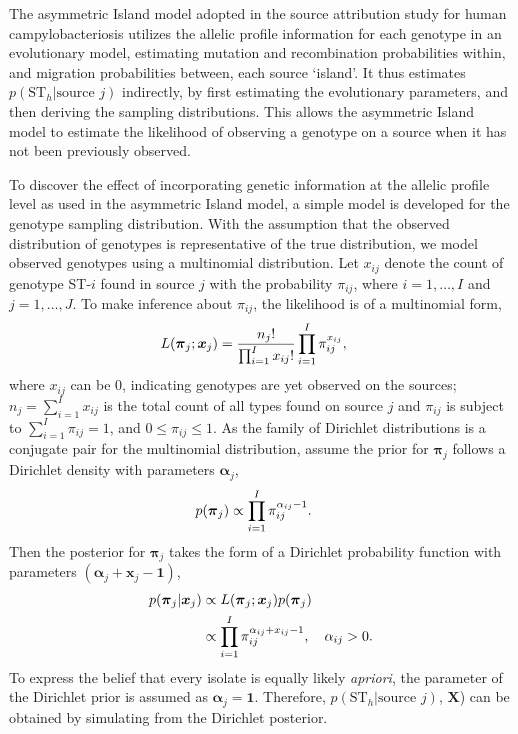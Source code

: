 \documentclass[AMA,STIX1COL]{WileyNJD-v2}
\begin{document}
The asymmetric Island model \cite{Wilso} adopted in the source attribution study for human campylobacteriosis \cite{Marsh} utilizes the allelic profile information for each genotype in an evolutionary model, estimating mutation and recombination probabilities within, and migration probabilities between, each source `island'. It thus estimates $p(\text{ST}_h \vert \text{source }j)$ indirectly, by first estimating the evolutionary parameters, and then deriving the sampling distributions. This allows the asymmetric Island model to estimate the likelihood of observing a genotype on a source when it has not been previously observed.

To discover the effect of incorporating genetic information at the allelic profile level as used in the asymmetric Island model, a simple model is developed for the genotype sampling distribution. With the assumption that the observed distribution of genotypes is representative of the true distribution, we model observed genotypes using a multinomial distribution. Let $x_{ij}$ denote the count of genotype ST-$i$ found in source $j$ with the probability $\pi_{ij}$, where $i=1, \ldots, I$ and $j=1, \ldots, J$. To make inference about $\pi_{ij}$, the likelihood is of a multinomial form,
\begin{align}
        L(\boldsymbol{\pi}_{j} ; \boldsymbol{x}_{j}) & = \frac{n_j!}{\prod_{i=1}^{I} x_{ij}!} \prod_{i=1}^I \pi_{ij}^{x_{ij}}, \notag
\end{align}
where $x_{ij}$ can be $0$, indicating genotypes are yet observed on the sources; $n_j=\sum_{i=1}^I x_{ij}$ is the total count of all types found on source $j$ and $\pi_{ij}$ is subject to $\sum_{i=1}^I \pi_{ij} =1$, and $0 \leq \pi_{ij} \leq 1$. As the family of Dirichlet distributions is a conjugate pair for the multinomial distribution, assume the prior for $\boldsymbol{\pi}_{j}$ follows a Dirichlet density with parameters $\boldsymbol{\alpha}_{j}$,
\begin{align}
  p(\boldsymbol{\pi}_{j}) & \propto \prod_{i=1}^{I}\pi_{ij}^{\alpha_{ij}-1}. \notag
\end{align}
Then the posterior for $\boldsymbol{\pi}_{j}$ takes the form of a Dirichlet probability function with parameters $(\boldsymbol{\alpha}_{j}+\boldsymbol{x}_{j}-\boldsymbol{1})$,
\begin{align}
        p(\boldsymbol{\pi}_{j} \vert \boldsymbol{x}_{j} ) & \propto L(\boldsymbol{\pi}_{j} ; \boldsymbol{x}_{j}) p(\boldsymbol{\pi}_{j}) \notag \\
       & \propto \prod_{i=1}^{I}\pi_{ij}^{\alpha_{ij} + x_{ij}-1}, \quad \alpha_{ij} >0. \notag
 \end{align}
To express the belief that every isolate is equally likely \emph{apriori}, the parameter of the Dirichlet prior is assumed as $\boldsymbol{\alpha}_{j}=\boldsymbol{1}$. Therefore, $p(\text{ST}_h \vert \text{source }j)$, $\boldsymbol{X}$) can be obtained by simulating from the Dirichlet posterior.
\end{document}
